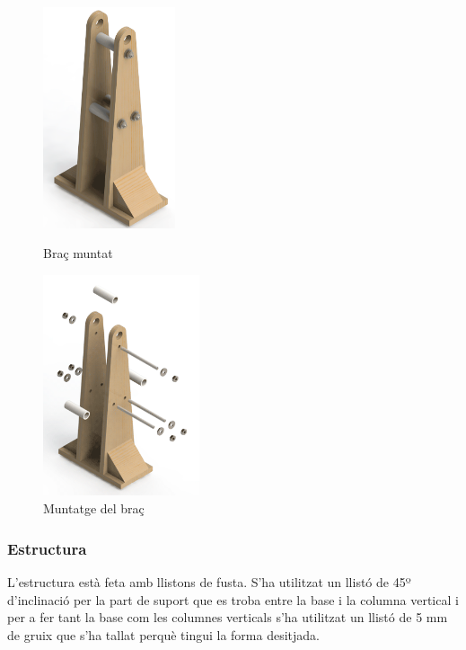 \begin{figure}[h!]
\begin{minipage}[b]{0.45\linewidth}
\centering
\includegraphics[height=6.5cm]{./imgComp/brac}
\caption{Braç muntat}
\end{minipage}
\begin{minipage}[b]{0.45\linewidth}
\centering
\includegraphics[height=6.5cm]{./imgComp/brac_expl}
\caption{Muntatge del braç}
\end{minipage}
\end{figure}

\subsubsection{Estructura}
L'estructura està feta amb llistons de fusta. S'ha utilitzat un llistó de 45º d'inclinació per la part de suport que es troba entre la base i la columna vertical i per a fer tant la base com les columnes verticals s'ha utilitzat un llistó de 5 mm de gruix que s'ha tallat perquè tingui la forma desitjada. 

